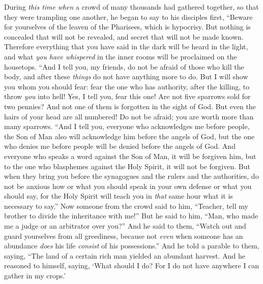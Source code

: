 \begin{biblechapter} %
 During \textit{this time} \textit{when} a crowd of many thousands had gathered together, so that they were trampling one another, he began to say to his disciples first, “Beware for yourselves of the leaven of the Pharisees, which is hypocrisy.
\verse But nothing is concealed that will not be revealed, and secret that will not be made known.
\verse Therefore everything that you have said in the dark will be heard in the light, and what \textit{you have whispered} in the inner rooms will be proclaimed on the housetops.
 “And I tell you, my friends, do not be afraid of those who kill the body, and after these \textit{things} do not have anything more to do.
\verse But I will show you whom you should fear: fear the one who has authority, after the killing, to throw \textit{you} into hell! Yes, I tell you, fear this one!
\verse Are not five sparrows sold for two pennies? And not one of them is forgotten in the sight of God.
\verse But even the hairs of your head are all numbered! Do not be afraid; you are worth more than many sparrows.
 “And I tell you, everyone who acknowledges me before people, the Son of Man also will acknowledge him before the angels of God,
\verse but the one who denies me before people will be denied before the angels of God.
\verse And everyone who speaks a word against the Son of Man, it will be forgiven him, but to the one who blasphemes against the Holy Spirit, it will not be forgiven.
\verse But when they bring you before the synagogues and the rulers and the authorities, do not be anxious how or what you should speak in your own defense or what you should say,
\verse for the Holy Spirit will teach you in \textit{that} same hour what it is necessary to say.”
 Now someone from the crowd said to him, “Teacher, tell my brother to divide the inheritance with me!”
\verse But he said to him, “Man, who made me a judge or an arbitrator over you?”
\verse And he said to them, “Watch out and guard yourselves from all greediness, because not \textit{even} when someone has an abundance \textit{does} his life \textit{consist} of his possessions.”
\verse And he told a parable to them, saying, “The land of a certain rich man yielded an abundant harvest.
\verse And he reasoned to himself, saying, ‘What should I do? For I do not have anywhere I can gather in my crops.’

\end{biblechapter}
